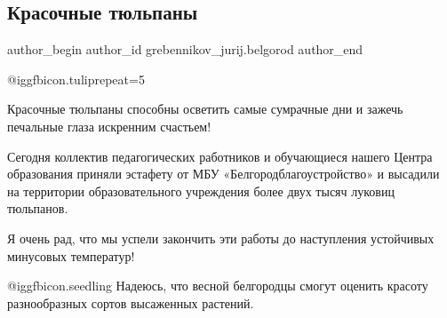  
 
 
 
 
 
\subsection{Красочные тюльпаны}
\label{sec:18_11_2021.fb.grebennikov_jurij.belgorod.1.tuljpany}
 
\ifcmt
 author_begin
   author_id grebennikov_jurij.belgorod
 author_end
\fi

 @igg{fbicon.tulip}{repeat=5} 

Красочные тюльпаны способны осветить самые сумрачные дни и зажечь печальные
глаза искренним счастьем!


Сегодня коллектив педагогических работников и обучающиеся нашего Центра
образования приняли эстафету от МБУ «Белгородблагоустройство» и высадили на
территории образовательного учреждения более двух тысяч луковиц тюльпанов. 


Я очень рад, что мы успели закончить эти работы до наступления устойчивых
минусовых температур! 

 @igg{fbicon.seedling} Надеюсь, что весной белгородцы смогут оценить красоту разнообразных сортов
высаженных растений.
